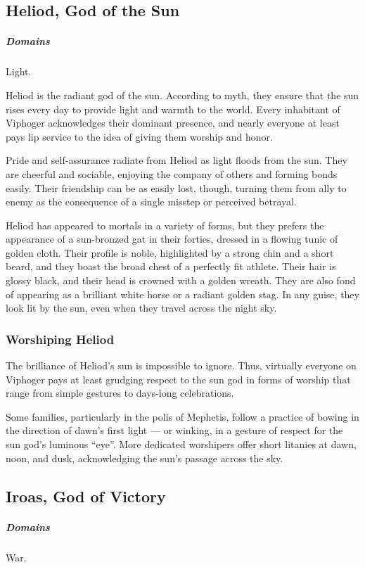 \subsection*{Heliod, God of the Sun} \label{ssec::heliod}
    \subparagraph{Domains} Light.

    Heliod is the radiant god of the sun.
    According to myth, they ensure that the sun rises every day to provide light and warmth to the world.
    Every inhabitant of Viphoger acknowledges their dominant presence, and nearly everyone at least pays lip service to the idea of giving them worship and honor.

    Pride and self-assurance radiate from Heliod as light floods from the sun.
    They are cheerful and sociable, enjoying the company of others and forming bonds easily.
    Their friendship can be as easily lost, though, turning them from ally to enemy as the consequence of a single misstep or perceived betrayal.

    Heliod has appeared to mortals in a variety of forms, but they prefers the appearance of a sun-bronzed gat in their forties, dressed in a flowing tunic of golden cloth.
    Their profile is noble, highlighted by a strong chin and a short beard, and they boast the broad chest of a perfectly fit athlete.
    Their hair is glossy black, and their head is crowned with a golden wreath.
    They are also fond of appearing as a brilliant white horse or a radiant golden stag.
    In any guise, they look lit by the sun, even when they travel across the night sky.

    \subsubsection{Worshiping Heliod}
        The brilliance of Heliod's sun is impossible to ignore.
        Thus, virtually everyone on Viphoger pays at least grudging respect to the sun god in forms of worship that range from simple gestures to days-long celebrations.

        Some families, particularly in the polis of Mephetis, follow a practice of bowing in the direction of dawn's first light --- or winking, in a gesture of respect for the sun god's luminous ``eye''.
        More dedicated worshipers offer short litanies at dawn, noon, and dusk, acknowledging the sun's passage across the sky.

\subsection*{Iroas, God of Victory} \label{ssec::iroas}
    \subparagraph{Domains} War.

